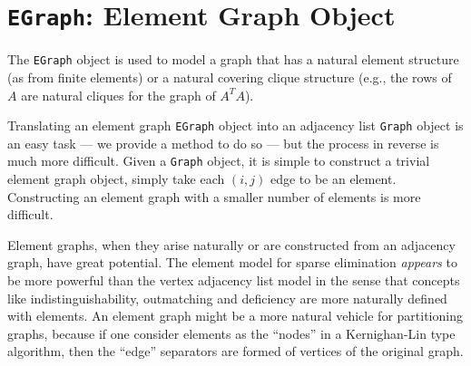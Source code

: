 \chapter{{\tt EGraph}: Element Graph Object}
\par
The {\tt EGraph} object is used to model a graph that has a natural
element structure (as from finite elements) or a natural covering
clique structure (e.g., the rows of $A$ are natural cliques for
the graph of $A^TA$).
\par
Translating an element graph {\tt EGraph} object 
into an adjacency list {\tt Graph} object is an easy task ---
we provide a method to do so --- but the process in reverse is much
more difficult.
Given a {\tt Graph} object, it is simple to construct a trivial 
element graph object, simply take each $(i,j)$ edge to be an element.
Constructing an element graph with a smaller number of elements 
is more difficult.
\par
Element graphs, when they arise naturally or are constructed from
an adjacency graph, have great potential. 
The element model for sparse elimination {\it appears} to be more
powerful than the vertex adjacency list model in the sense that
concepts like indistinguishability, outmatching and deficiency are
more naturally defined with elements.
An element graph might be a more natural vehicle for partitioning
graphs, because if one consider elements as the ``nodes'' in a
Kernighan-Lin type algorithm, then the ``edge'' separators are
formed of vertices of the original graph.
